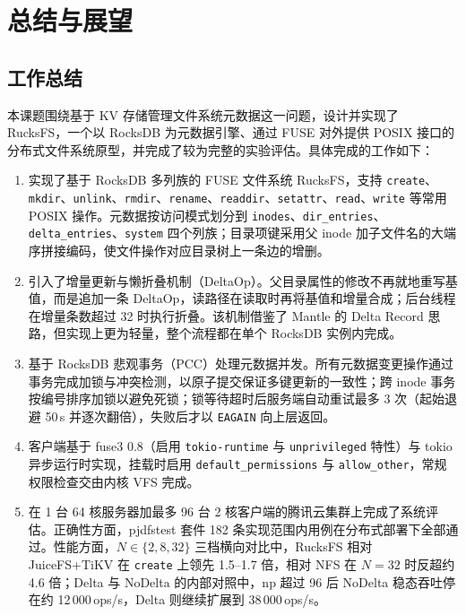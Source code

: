 \section{总结与展望}

\subsection{工作总结}

本课题围绕基于 KV 存储管理文件系统元数据这一问题，设计并实现了 RucksFS，一个以 RocksDB 为元数据引擎、通过 FUSE 对外提供 POSIX 接口的分布式文件系统原型，并完成了较为完整的实验评估。具体完成的工作如下：

\begin{enumerate}
    \item 实现了基于 RocksDB 多列族的 FUSE 文件系统 RucksFS，支持 \texttt{create}、\texttt{mkdir}、\texttt{unlink}、\texttt{rmdir}、\texttt{rename}、\texttt{readdir}、\texttt{setattr}、\texttt{read}、\texttt{write} 等常用 POSIX 操作。元数据按访问模式划分到 \texttt{inodes}、\texttt{dir\_entries}、\texttt{delta\_entries}、\texttt{system} 四个列族；目录项键采用父 inode 加子文件名的大端序拼接编码，使文件操作对应目录树上一条边的增删。

    \item 引入了增量更新与懒折叠机制（DeltaOp）。父目录属性的修改不再就地重写基值，而是追加一条 DeltaOp，读路径在读取时再将基值和增量合成；后台线程在增量条数超过 32 时执行折叠。该机制借鉴了 Mantle 的 Delta Record 思路，但实现上更为轻量，整个流程都在单个 RocksDB 实例内完成。

    \item 基于 RocksDB 悲观事务（PCC）处理元数据并发。所有元数据变更操作通过事务完成加锁与冲突检测，以原子提交保证多键更新的一致性；跨 inode 事务按编号排序加锁以避免死锁；锁等待超时后服务端自动重试最多 3 次（起始退避 50\,\textmu s 并逐次翻倍），失败后才以 \texttt{EAGAIN} 向上层返回。

    \item 客户端基于 fuse3 0.8（启用 \texttt{tokio-runtime} 与 \texttt{unprivileged} 特性）与 tokio 异步运行时实现，挂载时启用 \texttt{default\_permissions} 与 \texttt{allow\_other}，常规权限检查交由内核 VFS 完成。

    \item 在 1 台 64 核服务器加最多 96 台 2 核客户端的腾讯云集群上完成了系统评估。正确性方面，pjdfstest 套件 182 条实现范围内用例在分布式部署下全部通过。性能方面，$N \in \{2, 8, 32\}$ 三档横向对比中，RucksFS 相对 JuiceFS+TiKV 在 \texttt{create} 上领先 1.5--1.7 倍，相对 NFS 在 $N=32$ 时反超约 4.6 倍；Delta 与 NoDelta 的内部对照中，$\mathrm{np}$ 超过 96 后 NoDelta 稳态吞吐停在约 12\,000\,ops/s，Delta 则继续扩展到 38\,000\,ops/s。
\end{enumerate}

